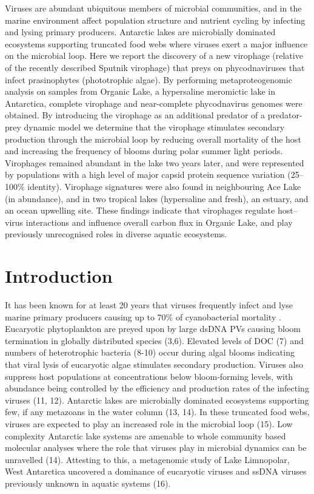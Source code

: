Viruses are abundant ubiquitous members of microbial communities, and in the marine environment affect population structure and nutrient cycling by infecting and lysing primary producers. 
Antarctic lakes are microbially dominated ecosystems supporting truncated food webs where viruses exert a major influence on the microbial loop. 
Here we report the discovery of a new virophage (relative of the recently described Sputnik virophage) that preys on phycodnaviruses that infect prasinophytes (phototrophic algae). 
By performing metaproteogenomic analysis on samples from Organic Lake, a hypersaline meromictic lake in Antarctica, complete virophage and near-complete phycodnavirus genomes were obtained. 
By introducing the virophage as an additional predator of a predator-prey dynamic model we determine that the virophage stimulates secondary production through the microbial loop by reducing overall mortality of the host and increasing the frequency of blooms during polar summer light periods. 
Virophages remained abundant in the lake two years later, and were represented by populations with a high level of major capsid protein sequence variation (25--100\% identity). 
Virophage signatures were also found in neighbouring Ace Lake (in abundance), and in two tropical lakes (hypersaline and fresh), an estuary, and an ocean upwelling site. 
These findings indicate that virophages regulate host--virus interactions and influence overall carbon flux in Organic Lake, and play previously unrecognised roles in diverse aquatic ecosystems.
\newpage

\section{Introduction}
It has been known for at least 20 years that viruses frequently infect and lyse marine primary producers causing up to 70\% of cyanobacterial mortality \cite{Proctor1990,Suttle1990}.
Eucaryotic phytoplankton are preyed upon by large ds\textsc{DNA} \acp{PV} causing bloom termination in globally distributed species (3,6).
Elevated levels of \ac{DOC} (7) and numbers of heterotrophic bacteria (8-10) occur during algal blooms indicating that viral lysis of eucaryotic algae stimulates secondary production. 
Viruses also suppress host populations at concentrations below bloom-forming levels, with abundance being controlled by the efficiency and production rates of the infecting viruses (11, 12). 
Antarctic lakes are microbially dominated ecosystems supporting few, if any metazoans in the water column (13, 14). 
In these truncated food webs, viruses are expected to play an increased role in the microbial loop (15). 
Low complexity Antarctic lake systems are amenable to whole community based molecular analyses where the role that viruses play in microbial dynamics can be unravelled (14). 
Attesting to this, a metagenomic study of Lake Limnopolar, West Antarctica uncovered a dominance of eucaryotic viruses and ss\textsc{DNA} viruses previously unknown in aquatic systems (16). 

